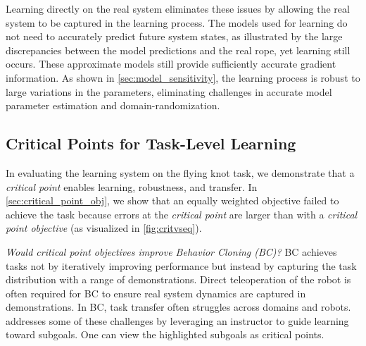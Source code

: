 \documentclass[conference]{IEEEtran}
\begin{document}
Learning directly on the real system eliminates these issues by allowing the real system to be captured in the learning process. The models used for learning do not need to accurately predict future system states, as illustrated by the large discrepancies between the model predictions and the real rope, yet learning still occurs. These approximate models still provide sufficiently accurate gradient information. As shown in \cref{sec:model_sensitivity}, the learning process is robust to large variations in the parameters, eliminating challenges in accurate model parameter estimation and domain-randomization.




\subsection{Critical Points for Task-Level Learning}
In evaluating the learning system on the flying knot task, we demonstrate that a \textit{critical point} enables learning, robustness, and transfer. In \cref{sec:critical_point_obj}, we show that an equally weighted objective failed to achieve the task because errors at the \textit{critical point} are larger than with a \textit{critical point objective} (as visualized in \cref{fig:critvseq}). 

\textit{Would critical point objectives improve Behavior Cloning (BC)?}
BC achieves tasks not by iteratively improving performance but instead by capturing the task distribution with a range of demonstrations. Direct teleoperation of the robot is often required for BC to ensure real system dynamics are captured in demonstrations. In BC, task transfer often struggles across domains and robots. \citet{hu_rac_2025} addresses some of these challenges by leveraging an instructor to guide learning toward subgoals. One can view the highlighted subgoals as
critical points.
\end{document}

